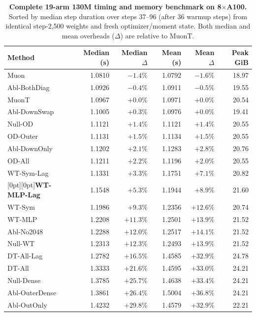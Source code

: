 \begin{table}[tbp]\centering\footnotesize
\setlength{\tabcolsep}{9.5pt}
\caption{\textbf{Complete 19-arm 130M timing and memory benchmark on 8$\times$A100.} Sorted by median step duration over steps 37--96 (after 36 warmup steps) from identical step-2,500 weights and fresh optimizer/moment state. Both median and mean overheads ($\Delta$) are relative to MuonT.}\label{tab:bench19}
\begin{tabularx}{\textwidth}{@{}>{\raggedright\arraybackslash}Xrrrrr@{}}
\toprule
Method & Median (s) & Median $\Delta$ & Mean (s) & Mean $\Delta$ & Peak GiB \\
\midrule
Muon & 1.0810 & $-1.4\%$ & 1.0792 & $-1.6\%$ & 18.97 \\
Abl-BothDiag & 1.0926 & $-0.4\%$ & 1.0911 & $-0.5\%$ & 19.55 \\
MuonT & 1.0967 & $+0.0\%$ & 1.0971 & $+0.0\%$ & 20.54 \\
Abl-DownSwap & 1.1005 & $+0.3\%$ & 1.0976 & $+0.0\%$ & 19.41 \\
Null-OD & 1.1121 & $+1.4\%$ & 1.1121 & $+1.4\%$ & 20.55 \\
OD-Outer & 1.1131 & $+1.5\%$ & 1.1134 & $+1.5\%$ & 20.55 \\
Abl-DownOnly & 1.1202 & $+2.1\%$ & 1.1283 & $+2.8\%$ & 20.76 \\
OD-All & 1.1211 & $+2.2\%$ & 1.1196 & $+2.0\%$ & 20.55 \\
WT-Sym-Lag & 1.1331 & $+3.3\%$ & 1.1751 & $+7.1\%$ & 20.82 \\
\rowcolor{rowtint}[0pt][0pt]\textbf{WT-MLP-Lag} & 1.1548 & $+5.3\%$ & 1.1944 & $+8.9\%$ & 21.60 \\
WT-Sym & 1.1986 & $+9.3\%$ & 1.2356 & $+12.6\%$ & 20.74 \\
WT-MLP & 1.2208 & $+11.3\%$ & 1.2501 & $+13.9\%$ & 21.52 \\
Abl-No2048 & 1.2288 & $+12.0\%$ & 1.2517 & $+14.1\%$ & 21.52 \\
Null-WT & 1.2313 & $+12.3\%$ & 1.2493 & $+13.9\%$ & 21.52 \\
DT-All-Lag & 1.2782 & $+16.5\%$ & 1.4585 & $+32.9\%$ & 24.78 \\
DT-All & 1.3333 & $+21.6\%$ & 1.4595 & $+33.0\%$ & 24.21 \\
Null-Dense & 1.3785 & $+25.7\%$ & 1.4638 & $+33.4\%$ & 24.21 \\
Abl-OuterDense & 1.3861 & $+26.4\%$ & 1.5004 & $+36.8\%$ & 24.21 \\
Abl-OutOnly & 1.4232 & $+29.8\%$ & 1.4579 & $+32.9\%$ & 22.21 \\
\bottomrule\end{tabularx}
\end{table}
